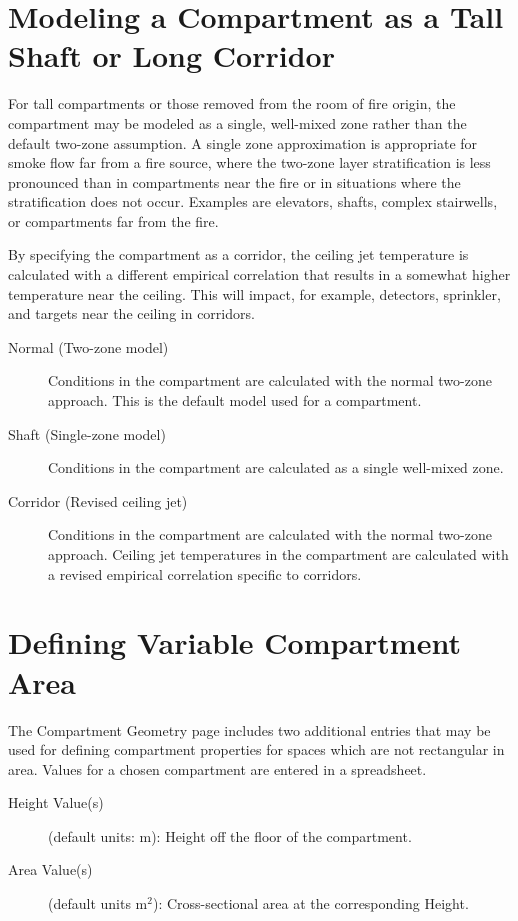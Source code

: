 \section{Modeling a Compartment as a Tall Shaft or Long Corridor}
\label{info:COMP3}
For tall compartments or those removed from the room of fire origin, the compartment may be modeled as a single, well-mixed zone rather than the default two-zone assumption. A single zone approximation is appropriate for smoke flow far from a fire source, where the two-zone layer stratification is less pronounced than in compartments near the fire or in situations where the stratification does not occur. Examples are elevators, shafts, complex stairwells, or compartments far from the fire.

By specifying the compartment as a corridor, the ceiling jet temperature is calculated with a different empirical correlation that results in a somewhat higher temperature near the ceiling.  This will impact, for example, detectors, sprinkler, and targets near the ceiling in corridors.

\begin{description}
\item[Normal (Two-zone model)] Conditions in the compartment are calculated with the normal two-zone approach. This is the default model used for a compartment.

\item[Shaft (Single-zone model)] Conditions in the compartment are calculated as a single well-mixed zone.

\item[Corridor (Revised ceiling jet)] Conditions in the compartment are calculated with the normal two-zone approach. Ceiling jet temperatures in the compartment are calculated with a revised empirical correlation specific to corridors.
\end{description}




\section{Defining Variable Compartment Area}
\label{info:COMP4}
The Compartment Geometry page includes two additional entries that may be used for defining compartment properties for spaces which are not rectangular in area.  Values for a chosen compartment are entered in a spreadsheet.
\begin{description}
\item[Height Value(s)] (default units: m): Height off the floor of the compartment.
\item[Area Value(s)] (default units m$^2$): Cross-sectional area at the corresponding Height.
\end{description}

